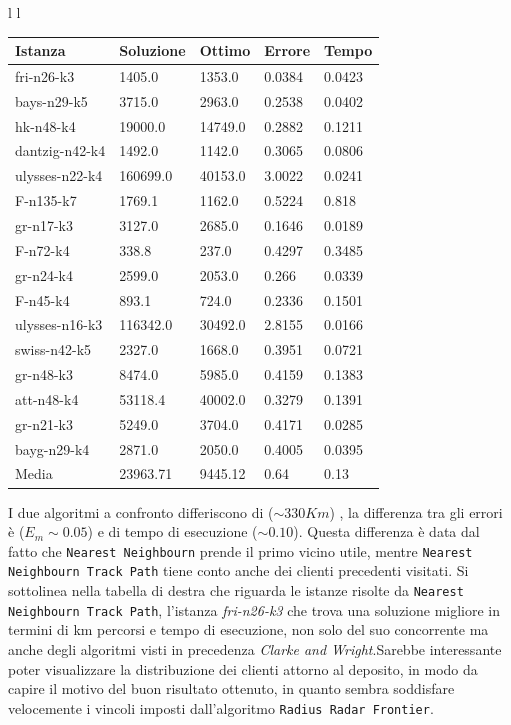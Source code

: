 \documentclass[]{article}
\begin{document}
\begin{tabular}{l l}
\small		
	\begin{tabular}{||l | l l l l||} 
		\hline
		Istanza & Soluzione & Ottimo & Errore & Tempo \\ [0.5ex] 
		\hline\hline
		\rowcolor{green}
		fri-n26-k3 & 1405.0 & 1353.0 & 0.0384 & 0.0423  \\
		\rowcolor{white}
		bays-n29-k5 & 3715.0 & 2963.0 & 0.2538 & 0.0402  \\
		hk-n48-k4 & 19000.0 & 14749.0 & 0.2882 & 0.1211  \\
		dantzig-n42-k4 & 1492.0 & 1142.0 & 0.3065 & 0.0806  \\
		ulysses-n22-k4 & 160699.0 & 40153.0 & 3.0022 & 0.0241  \\
		F-n135-k7 & 1769.1 & 1162.0 & 0.5224 & 0.818  \\
		gr-n17-k3 & 3127.0 & 2685.0 & 0.1646 & \cellcolor{yellow} 0.0189  \\
		F-n72-k4 & 338.8 & 237.0 & 0.4297 & 0.3485  \\
		gr-n24-k4 & 2599.0 & 2053.0 & 0.266 & 0.0339  \\
		F-n45-k4 & 893.1 & 724.0 & 0.2336 & 0.1501  \\
		ulysses-n16-k3 & 116342.0 & 30492.0 & 2.8155 & 0.0166  \\
		swiss-n42-k5 & 2327.0 & 1668.0 & 0.3951 & 0.0721  \\
		gr-n48-k3 & 8474.0 & 5985.0 & 0.4159 & 0.1383  \\
		att-n48-k4 & 53118.4 & 40002.0 & 0.3279 & 0.1391  \\
		gr-n21-k3 & 5249.0 & 3704.0 & 0.4171 & 0.0285  \\
		bayg-n29-k4 & 2871.0 & 2050.0 & 0.4005 & 0.0395  \\
		\hline
		Media & 23963.71 & 9445.12 & 0.64 & 0.13  \\			
		[1ex] 
		\hline

	\end{tabular}
	
\end{tabular}

I due algoritmi a confronto differiscono di ($\sim 330 Km$) , la differenza tra gli errori è ($ E_m\sim 0.05$) e di tempo di esecuzione ($ \sim 0.10$). Questa differenza è data dal fatto che \texttt{Nearest Neighbourn} prende il primo vicino utile, mentre \texttt{Nearest Neighbourn Track Path} tiene conto anche dei clienti precedenti visitati. Si sottolinea nella tabella di destra che riguarda le istanze risolte da \texttt{Nearest Neighbourn Track Path}, l'istanza \textit{fri-n26-k3} che trova una soluzione migliore in termini di km percorsi e tempo di esecuzione, non solo del suo concorrente ma anche degli algoritmi visti in precedenza \textit{Clarke and Wright}.Sarebbe interessante poter visualizzare la distribuzione dei clienti attorno al deposito, in modo da capire il motivo del buon risultato ottenuto, in quanto sembra soddisfare velocemente i vincoli imposti dall'algoritmo \texttt{Radius Radar Frontier}.
\end{document}
